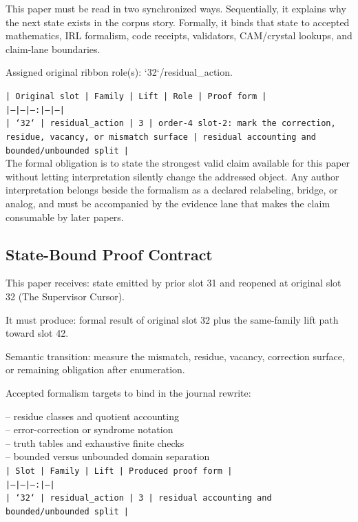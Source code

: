 \documentclass[11pt]{article}
\begin{document}
This paper must be read in two synchronized ways. Sequentially, it explains why
the next state exists in the corpus story. Formally, it binds that state to
accepted mathematics, IRL formalism, code receipts, validators, CAM/crystal
lookups, and claim-lane boundaries.

Assigned original ribbon role(s): `32`/residual\_action.

\noindent\texttt{| Original slot | Family | Lift | Role | Proof form |}\\
\noindent\texttt{|---|---|---:|---|---|}\\
\noindent\texttt{| `32` | residual\_action | 3 | order-4 slot-2: mark the correction, residue, vacancy, or mismatch surface | residual accounting and bounded/unbounded split |}\\

The formal obligation is to state the strongest valid claim available for this
paper without letting interpretation silently change the addressed object. Any
author interpretation belongs beside the formalism as a declared relabeling,
bridge, or analog, and must be accompanied by the evidence lane that makes the
claim consumable by later papers.

\subsection*{State-Bound Proof Contract}

This paper receives: state emitted by prior slot 31 and reopened at original slot 32 (The Supervisor Cursor).

It must produce: formal result of original slot 32 plus the same-family lift path toward slot 42.

Semantic transition: measure the mismatch, residue, vacancy, correction surface, or remaining obligation after enumeration.

Accepted formalism targets to bind in the journal rewrite:

\noindent{}-- residue classes and quotient accounting\\
\noindent{}-- error-correction or syndrome notation\\
\noindent{}-- truth tables and exhaustive finite checks\\
\noindent{}-- bounded versus unbounded domain separation\\

\noindent\texttt{| Slot | Family | Lift | Produced proof form |}\\
\noindent\texttt{|---|---|---:|---|}\\
\noindent\texttt{| `32` | residual\_action | 3 | residual accounting and bounded/unbounded split |}\\
\end{document}

